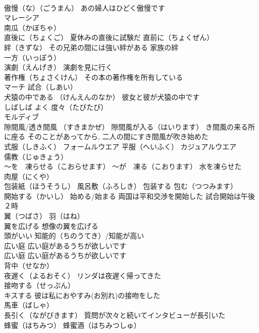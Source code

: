 \documentclass[8pt]{extreport}
\begin{document}
\begin{CJK}{UTF8}{min}
\\	傲慢（な）（ごうまん） あの婦人はひどく傲慢です
\\	マレーシア
\\	南瓜（かぼちゃ）
\\	直後に（ちょくご） 夏休みの直後に試験だ 直前に（ちょくぜん）
\\	絆（きずな） その兄弟の間には強い絆がある 家族の絆
\\	一方（いっぽう）
\\	演劇（えんげき） 演劇を見に行く
\\	著作権（ちょさくけん） その本の著作権を所有している
\\	マーチ 試合（しあい）
\\	犬猿の中である （けんえんのなか） 彼女と彼が犬猿の中です
\\	しばしば よく 度々（たびたび）
\\	モルディブ
\\	隙間風/透き間風 （すきまかぜ） 隙間風が入る（はいります） き間風の来る所に座る そのことがあってから, 二人の間にすき間風が吹き始めた
\\	式服（しきふく） フォームルウエア 平服（へいふく） カジュアルウエア
\\	儒教（じゅきょう）
\\	～を　凍らせる（こおらせます） ～が　凍る（こおります） 水を凍らせた
\\	肉屋（にくや）
\\	包装紙（ほうそうし） 風呂敷（ふろしき） 包装する 包む（つつみます）
\\	開始する（かいし） 始める/始まる 両国は平和交渉を開始した 試合開始は午後２時
\\	翼（つばさ） 羽（はね）
\\	翼を広げる 想像の翼を広げる
\\	頭がいい 知能的（ちのうてき）/知能が高い
\\	広い庭 広い庭があるうちが欲しいです 
\\	広い庭 広い庭があるうちが欲しいです
\\	背中（せなか）
\\	夜遅く（よるおそく） リンダは夜遅く帰ってきた
\\	接吻する（せっぷん）
\\	キスする 彼は私におやすみ(お別れ)の接吻をした
\\	馬車（ばしゃ）
\\	長引く（ながびきます） 質問が次々と続いてインタビューが長引いた
\\	蜂蜜（はちみつ） 蜂蜜酒（はちみつしゅ）

\end{CJK}
\end{document}
